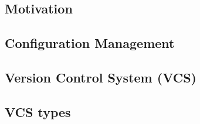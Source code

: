 \subsection{Motivation}



\subsection{Configuration Management}



\subsection{Version Control System (VCS)}



\subsection{VCS types}


